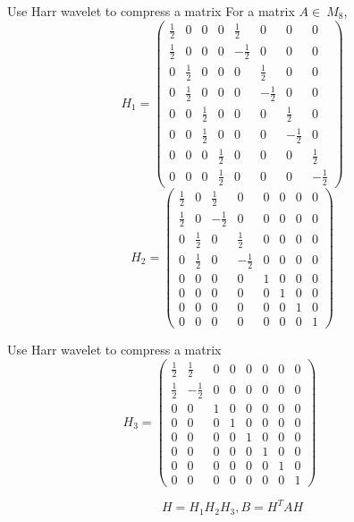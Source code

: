 \documentclass{beamer}
\begin{document}
\begin{frame}{Use Harr wavelet to compress a matrix}
For a matrix $A \in\ M_8$,
\small
{
\[
H_1 = \left(\begin{array}{cccccccc}
\frac{1}{2} & 0 & 0 & 0 & \frac{1}{2} & 0 & 0 & 0\\
\frac{1}{2} & 0 & 0 & 0 & -\frac{1}{2} & 0 & 0 & 0 \\
0 & \frac{1}{2} & 0 & 0 & 0 & \frac{1}{2} & 0 & 0 \\
0 & \frac{1}{2} & 0 & 0 & 0 & -\frac{1}{2} & 0 & 0 \\
0 & 0 & \frac{1}{2} & 0 & 0 & 0 & \frac{1}{2} & 0 \\
0 & 0 & \frac{1}{2} & 0 & 0 & 0 & -\frac{1}{2} & 0 \\
0 & 0 & 0 & \frac{1}{2} & 0 & 0 & 0 & \frac{1}{2}\\
0 & 0 & 0 & \frac{1}{2} & 0 & 0 & 0 & -\frac{1}{2}
\end{array}\right)
\]
\[
H_2=\left(\begin{array}{cccccccc}
\frac{1}{2} & 0 & \frac{1}{2} & 0 & 0 & 0& 0& 0\\
\frac{1}{2} & 0 & -\frac{1}{2} & 0 & 0 & 0& 0& 0 \\
0 & \frac{1}{2} & 0 & \frac{1}{2} & 0 & 0& 0& 0 \\
0 & \frac{1}{2} & 0 & -\frac{1}{2} & 0 & 0& 0& 0 \\
0&0 & 0 & 0 & 1 & 0 & 0& 0 \\
0&0 & 0 & 0 & 0 & 1 & 0& 0 \\
0&0&0 & 0 & 0 & 0 & 1 & 0\\
0&0&0 & 0 & 0 & 0 & 0 & 1
\end{array}\right)
\]
}
\end{frame}

\begin{frame}{Use Harr wavelet to compress a matrix}
\[
H_3 = \left(\begin{array}{cccccccc}
\frac{1}{2} & \frac{1}{2} & 0 & 0 & 0 & 0& 0& 0\\
\frac{1}{2} & -\frac{1}{2} & 0 & 0 & 0 & 0& 0& 0 \\
0 & 0 & 1 & 0 & 0 & 0 & 0 & 0 \\
0 & 0 & 0 & 1 & 0 & 0 & 0 & 0 \\
0 & 0 & 0 & 0 & 1 & 0 & 0 & 0 \\
0 & 0 & 0 & 0 & 0 & 1 & 0 & 0 \\
0 & 0 & 0 & 0 & 0 & 0 & 1 & 0 \\
0 & 0 & 0 & 0 & 0 & 0 & 0 & 1
\end{array}\right)
\quad \quad 
\]

\medskip \medskip

\[
H = H_1H_2H_3, B = H^TAH
\]

\end{frame}
\end{document}
